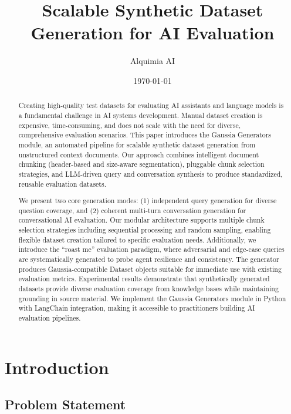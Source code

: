 \documentclass[11pt,a4paper]{article}
\title{Scalable Synthetic Dataset Generation for AI Evaluation}
\author{Alquimia AI}
\date{\today}
\begin{document}
\maketitle

\begin{abstract}

Creating high-quality test datasets for evaluating AI assistants and language models is a fundamental challenge in AI systems development. Manual dataset creation is expensive, time-consuming, and does not scale with the need for diverse, comprehensive evaluation scenarios. This paper introduces the Gaussia Generators module, an automated pipeline for scalable synthetic dataset generation from unstructured context documents. Our approach combines intelligent document chunking (header-based and size-aware segmentation), pluggable chunk selection strategies, and LLM-driven query and conversation synthesis to produce standardized, reusable evaluation datasets.

We present two core generation modes: (1) independent query generation for diverse question coverage, and (2) coherent multi-turn conversation generation for conversational AI evaluation. Our modular architecture supports multiple chunk selection strategies including sequential processing and random sampling, enabling flexible dataset creation tailored to specific evaluation needs. Additionally, we introduce the ``roast me'' evaluation paradigm, where adversarial and edge-case queries are systematically generated to probe agent resilience and consistency. The generator produces Gaussia-compatible Dataset objects suitable for immediate use with existing evaluation metrics. Experimental results demonstrate that synthetically generated datasets provide diverse evaluation coverage from knowledge bases while maintaining grounding in source material. We implement the Gaussia Generators module in Python with LangChain integration, making it accessible to practitioners building AI evaluation pipelines.


\end{abstract}

\section{Introduction}

\subsection{Problem Statement}
\end{document}
